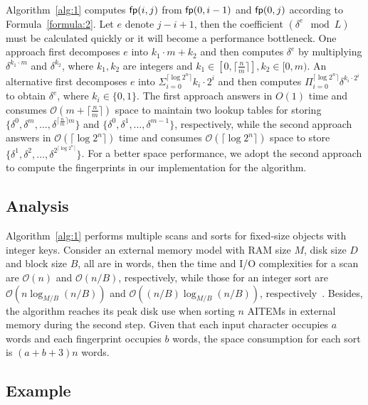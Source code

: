 \documentclass[10pt,journal,compsoc]{IEEEtran}
\begin{document}
	Algorithm~\ref{alg:1} computes ${\sf fp}(i, j)$ from ${\sf fp}(0, i - 1)$ and ${\sf fp}(0, j)$ according to Formula~\ref{formula:2}. Let $e$ denote $j - i + 1$, then the coefficient $(\delta^{e} \mod L)$ must be calculated quickly or it will become a performance bottleneck. One approach first decomposes $e$ into $k_1 \cdot m + k_2$ and then computes $\delta^{e}$ by multiplying $\delta^{k_1 \cdot m}$ and $\delta^{k_2}$, where $k_1, k_2$ are integers and $k_1 \in [0, \lceil \frac{n}{m} \rceil], k_2 \in [0, m)$. An alternative first decomposes $e$ into $\Sigma_{i = 0}^{\lceil \log2^n \rceil}{k_i \cdot 2^i}$ and then computes $\Pi_{i = 0}^{\lceil \log2^n \rceil}{\delta}^{k_i \cdot 2^i}$ to obtain $\delta^{e}$, where $k_i \in \{0, 1\}$. The first approach answers in ${O}(1)$ time and consumes $\mathcal{O}(m + \lceil \frac{n}{m} \rceil )$ space to maintain two lookup tables for storing $\{{\delta}^{0}, {\delta}^{m}, \dots, {\delta}^{\lceil \frac{n}{m} \rceil m}\}$ and $\{{\delta}^{0}, {\delta}^{1},\dots,{\delta}^{m - 1} \}$, respectively, while the second approach answers in $\mathcal{O}(\lceil \log2^n \rceil)$ time and consumes $\mathcal{O}(\lceil \log2^n \rceil)$ space to store $\{{\delta}^{1}, {\delta}^{2}, \dots, {\delta}^{2^{\lceil \log2^n \rceil}} \}$. For a better space performance, we adopt the second approach to compute the fingerprints in our implementation for the algorithm.
	
	
	\subsection{Analysis} \label{sec:method1:analysis}
	
	Algorithm~\ref{alg:1} performs multiple scans and sorts for fixed-size objects with integer keys.	Consider an external memory model with RAM size $M$, disk size $D$ and block size $B$, all are in words, then the time and I/O complexities for a scan are $\mathcal{O}(n)$ and $\mathcal{O}(n / B)$, respectively, while those for an integer sort are $\mathcal{O}(n\log_{M/ B}(n / B))$ and $\mathcal{O}((n / B)\log_{M / B}(n / B))$, respectively~\cite{Arge2013}. Besides, the algorithm reaches its peak disk use when sorting $n$ AITEMs in external memory during the second step. Given that each input character occupies $a$ words and each fingerprint occupies $b$ words, the space consumption for each sort is $(a + b + 3)n$ words.
	
	\subsection{Example} \label{sec:method1:example}
	
\end{document}
